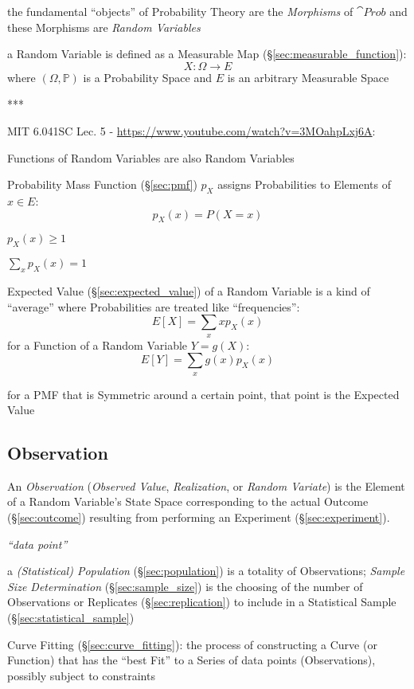 the fundamental ``objects'' of Probability Theory are the \emph{Morphisms} of
$\cat{Prob}$ and these Morphisms are \emph{Random Variables}

a Random Variable is defined as a Measurable Map
(\S\ref{sec:measurable_function}):
\[
  X : \Omega \rightarrow E
\]
where $(\Omega,\mathbb{P})$ is a Probability Space and $E$ is an arbitrary
Measurable Space

***

MIT 6.041SC Lec. 5 - \url{https://www.youtube.com/watch?v=3MOahpLxj6A}:

Functions of Random Variables are also Random Variables

Probability Mass Function (\S\ref{sec:pmf}) $p_X$ assigns
Probabilities to Elements of $x \in E$:
\[
  p_X(x) = P(X = x)
\]

$p_X(x) \geq 1$

$\sum_x p_X(x) = 1$

Expected Value (\S\ref{sec:expected_value}) of a Random Variable is a kind of
``average'' where Probabilities are treated like ``frequencies'':
\[
  E[X] = \sum_x xp_X(x)
\]
for a Function of a Random Variable $Y = g(X)$:
\[
  E[Y] = \sum_x g(x)p_X(x)
\]

for a PMF that is Symmetric around a certain point, that point is the Expected
Value



\subsection{Observation}\label{sec:observation}

An \emph{Observation} (\emph{Observed Value}, \emph{Realization}, or
\emph{Random Variate}) is the Element of a Random Variable's State Space
corresponding to the actual Outcome (\S\ref{sec:outcome}) resulting from
performing an Experiment (\S\ref{sec:experiment}).

\emph{``data point''}

\fist a \emph{(Statistical) Population} (\S\ref{sec:population}) is a totality
of Observations; \emph{Sample Size Determination} (\S\ref{sec:sample_size}) is
the choosing of the number of Observations or Replicates
(\S\ref{sec:replication}) to include in a Statistical Sample
(\S\ref{sec:statistical_sample})

\fist Curve Fitting (\S\ref{sec:curve_fitting}): the process of constructing a
Curve (or Function) that has the ``best Fit'' to a Series of data points
(Observations), possibly subject to constraints

